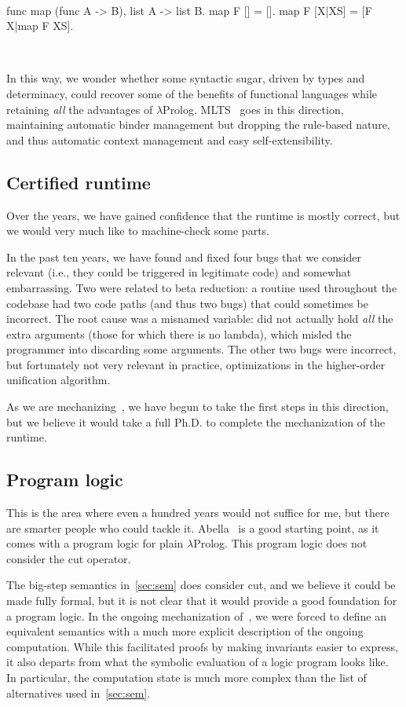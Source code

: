 \documentclass[a4paper, 11pt]{book}
\newenvironment{elpicode}
  {\VerbatimEnvironment~\\\begin{elpibox}\begin{xelpicode}}{\end{xelpicode}
\end{elpibox}\\}
\begin{document}
\begin{elpicode}
func map (func A -> B), list A -> list B.
map F [] = [].
map F [X|XS] = [F X|map F XS].
\end{elpicode}

\noindent In this way, we
wonder whether some syntactic sugar, driven by types and determinacy, could
recover some of the benefits of functional languages while retaining \emph{all}
the advantages of $\lambda$Prolog. MLTS~\cite{mlts} goes in this direction,
maintaining automatic binder management but dropping the rule-based nature, and
thus automatic context management and easy self-extensibility.

\subsection{Certified runtime}

Over the years, we have gained confidence that the runtime is mostly correct,
but we would very much like to machine-check some parts.

In the past ten years, we have found and fixed four bugs that we consider
relevant (i.e., they could be triggered in legitimate code) and somewhat
embarrassing. Two were related to beta reduction: a routine used throughout the
codebase had two code paths (and thus two bugs) that could sometimes be
incorrect. The root cause was a misnamed variable:  did not
actually hold \emph{all} the extra arguments (those for which there is no
lambda), which misled the programmer into discarding some arguments. The other
two bugs were incorrect, but fortunately not very relevant in practice,
optimizations in the higher-order unification algorithm.

As we are mechanizing~\cite{elpidet}, we have begun to take the first steps in
this direction, but we believe it would take a full Ph.D. to complete the
mechanization of the runtime.

\subsection{Program logic}

This is the area where even a hundred years would not suffice for me, but there
are smarter people who could tackle it. Abella~\cite{abella} is a good starting
point, as it comes with a program logic for plain $\lambda$Prolog. This program
logic does not consider the cut operator. 

The big-step semantics
in~\cref{sec:sem} does consider cut, and we believe it could be made fully
formal, but it is not clear that it would provide a good foundation for a
program logic. In the ongoing mechanization of~\cite{elpidet}, we were forced
to define an equivalent semantics with a much more explicit description of the
ongoing computation. While this facilitated proofs by making invariants easier
to express, it also departs from what the symbolic evaluation of a logic
program looks like. In particular, the computation state is much more complex
than the list of alternatives used in~\cref{sec:sem}.
\end{document}
